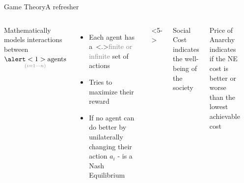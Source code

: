 \documentclass[aspectratio=169]{beamer}
\begin{document}
\begin{frame}{Game Theory}{A refresher}

    \begin{columns}
        
    \begin{block}{}
        Mathematically models interactions between $\underset{\textcolor{gray}{\small (i = 1 \cdots n)}}{\alert<1>{\text{agents}}}$
    \end{block}

    \begin{itemize}
        \item<2-> Each agent has a~\only<.>{\textcolor{gray}{finite or infinite }}set of \alert<2>{actions} 
        \item<3-> Tries to maximize their \alert<3>{reward} 
        \item<4-> If no agent can do better by unilaterally changing their action $a_i$ -  is a \alert<4->{Nash Equilibrium}
    \end{itemize}
    
    \begin{columns}<5->
        \begin{block}{Social Cost}
            \small{indicates the well-being of the society}
            \begin{center}
            \end{center}
        \end{block}
        \begin{block}{Price of Anarchy} \small
            indicates if the NE cost is better or worse than the lowest achievable cost
        \end{block}
    \end{columns}
    
    \begin{center}
    

\end{center}
\end{columns}
\end{frame}
\end{document}
